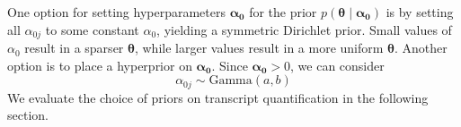 One option for setting hyperparameters $\bm{\alpha_0}$ for the prior $p(\bm{\theta}\mid\bm{\alpha_0})$ is by setting all $\alpha_{0j}$ to some constant $\alpha_0$, yielding a symmetric Dirichlet prior. Small values of $\alpha_0$ result in a sparser $\bm\theta$, while larger values result in a more uniform $\bm\theta$. Another option is to place a hyperprior on $\bm{\alpha_0}$. Since $\bm{\alpha_0}>0$, we can consider
\begin{equation}
    \alpha_{0j}\sim\textrm{Gamma}(a,b)
\end{equation}
We evaluate the choice of priors on transcript quantification in the following section. 

